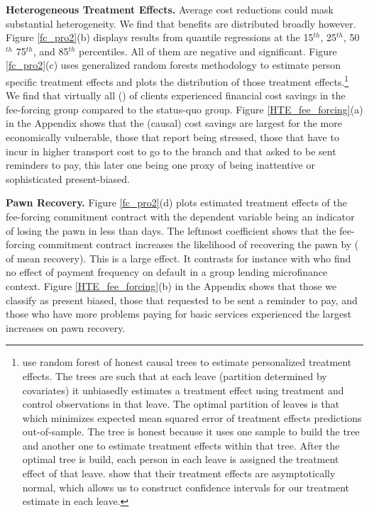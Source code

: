 \documentclass[11pt]{article}
\begin{document}
\vspace{.2in}
\noindent \textbf{Heterogeneous Treatment Effects.} Average cost reductions could mask substantial heterogeneity. We find that benefits are distributed broadly however. Figure \ref{fc_pro2}(b) displays results from quantile regressions at the 15$^{th}$, 25$^{th}$, 50$^{th}$ 75$^{th}$, and 85$^{th}$ percentiles. All of them are negative and significant. Figure \ref{fc_pro2}(c) uses \cite{atheygrf} generalized random forests methodology to estimate person specific treatment effects and plots the distribution of those treatment effects.\footnote{\cite{atheygrf} use random forest of honest causal trees to estimate personalized treatment effects. The trees are such that at each leave (partition determined by covariates) it unbiasedly estimates a treatment effect using treatment and control observations in that leave. The optimal partition of leaves is that which minimizes expected mean squared error of treatment effects predictions out-of-sample. The tree is honest because it uses one sample to build the tree and another one to estimate treatment effects within that tree. After the optimal tree is build, each person in each leave is assigned the treatment effect of that leave. \cite{atheygrf} show that their treatment effects are asymptotically normal, which allows us to construct confidence intervals for our treatment estimate in each leave.} We find that virtually all () of clients experienced financial cost savings in the fee-forcing group compared to the status-quo group. Figure \ref{HTE_fee_forcing}(a) in the Appendix shows that the (causal) cost savings are largest for the more economically vulnerable, %
those that report being stressed, those that have to incur in higher transport cost to go to the branch  and that asked to be sent reminders to pay, this later one being one proxy of being inattentive or sophisticated present-biased.

\vspace{.2in}
\noindent \textbf{Pawn Recovery.} Figure \ref{fc_pro2}(d) plots estimated treatment effects of the fee-forcing commitment contract with the dependent variable being an indicator of losing the pawn in less than  days. The leftmost coefficient shows that the fee-forcing commitment contract increases the likelihood of recovering the pawn by  ( of mean recovery). This is a large effect. It contrasts for instance with \cite{Pande} who find no effect of payment frequency on default in a group lending microfinance context. Figure \ref{HTE_fee_forcing}(b) in the Appendix shows that those we classify as present biased, those that requested to be sent a reminder to pay, and those who have more problems paying for basic services experienced the largest increases on pawn recovery.
\end{document}
